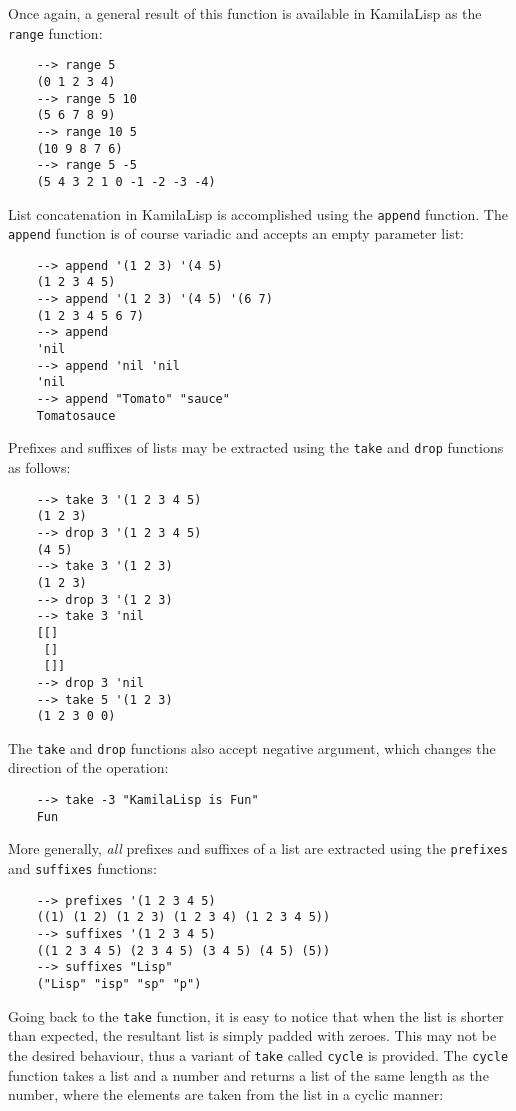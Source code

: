 Once again, a general result of this function is available in KamilaLisp as the \verb|range| function:

\begin{Verbatim}
    --> range 5
    (0 1 2 3 4)
    --> range 5 10
    (5 6 7 8 9)
    --> range 10 5
    (10 9 8 7 6)
    --> range 5 -5
    (5 4 3 2 1 0 -1 -2 -3 -4)
\end{Verbatim}

List concatenation in KamilaLisp is accomplished using the \verb|append| function. The \verb|append| function is of course variadic and accepts an empty parameter list:

\begin{Verbatim}
    --> append '(1 2 3) '(4 5)
    (1 2 3 4 5)
    --> append '(1 2 3) '(4 5) '(6 7)
    (1 2 3 4 5 6 7)
    --> append
    'nil
    --> append 'nil 'nil
    'nil
    --> append "Tomato" "sauce"
    Tomatosauce
\end{Verbatim}

Prefixes and suffixes of lists may be extracted using the \verb|take| and \verb|drop| functions as follows:

\begin{Verbatim}
    --> take 3 '(1 2 3 4 5)
    (1 2 3)
    --> drop 3 '(1 2 3 4 5)
    (4 5)
    --> take 3 '(1 2 3)
    (1 2 3)
    --> drop 3 '(1 2 3)
    --> take 3 'nil
    [[]
     []
     []]
    --> drop 3 'nil
    --> take 5 '(1 2 3)
    (1 2 3 0 0)
\end{Verbatim}

The \verb|take| and \verb|drop| functions also accept negative argument, which changes the direction of the operation:

\begin{Verbatim}
    --> take -3 "KamilaLisp is Fun"
    Fun
\end{Verbatim}

More generally, \textit{all} prefixes and suffixes of a list are extracted using the \verb|prefixes| and \verb|suffixes| functions:

\begin{Verbatim}
    --> prefixes '(1 2 3 4 5)
    ((1) (1 2) (1 2 3) (1 2 3 4) (1 2 3 4 5))
    --> suffixes '(1 2 3 4 5)
    ((1 2 3 4 5) (2 3 4 5) (3 4 5) (4 5) (5))
    --> suffixes "Lisp"
    ("Lisp" "isp" "sp" "p")
\end{Verbatim}

Going back to the \verb|take| function, it is easy to notice that when the list is shorter than expected, the resultant list is simply padded with zeroes. This may not be the desired behaviour, thus a variant of \verb|take| called \verb|cycle| is provided. The \verb|cycle| function takes a list and a number and returns a list of the same length as the number, where the elements are taken from the list in a cyclic manner:

